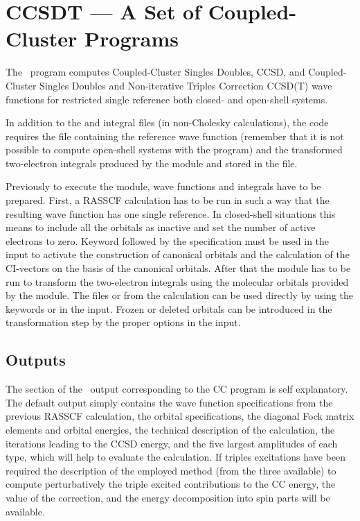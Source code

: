 \section{CCSDT --- A Set of Coupled-Cluster Programs}
\label{TUT:sec:ccsdt}

The \molcas\ program  
computes Coupled-Cluster Singles Doubles, CCSD, and Coupled-Cluster Singles
Doubles and Non-iterative Triples Correction CCSD(T) wave functions
for restricted single reference
both closed- and open-shell systems. 

In addition to the  and  integral files
(in non-Cholesky calculations),
the  code requires the  file containing the
reference wave function (remember that it is not possible to
compute open-shell systems with the  program) and
the transformed two-electron integrals produced by the 
module and stored in the  file. 


Previously to execute the  module, wave functions
and integrals have to be prepared. First, a RASSCF calculation has
to be run in such a way that the resulting wave function has one
single reference. In closed-shell situations this means to include
all the orbitals as inactive and set the number of active electrons to zero.
Keyword  followed by the specification 
must be used in
the  input to activate the construction of canonical
orbitals and the calculation of the CI-vectors on the basis of
the canonical orbitals.
After that the  module has to
be run to transform the two-electron integrals using the molecular
orbitals provided by the  module. 
The files  or  from the
 calculation can be used directly by 
using the keywords  or  in the  input.
Frozen or
deleted orbitals can be introduced in the transformation step
by the proper options in the  input. 

\subsection{ Outputs}

The section of the \molcas\ output corresponding to the CC program
is self explanatory. The default output simply contains
the wave function specifications from the previous RASSCF calculation,
the orbital specifications, the diagonal Fock matrix elements and orbital 
energies, the technical description of the calculation, the iterations leading to the CCSD energy,
and the five largest amplitudes of each type, which will help to evaluate
the calculation. If triples excitations have been required the description
of the employed method (from the three available) to compute perturbatively
the triple excited contributions to the CC energy, the value of the
correction, and the energy decomposition into spin parts will be available.

